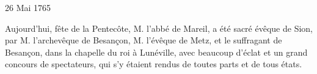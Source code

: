                      \begin{diary}{26 Mai 1765}{}
                        
                         Aujourd'hui, fête de la Pentecôte,
                              M. l'abbé
                              de Mareil, a été sacré évêque de Sion,
                           par M. l'archevêque de
                              Besançon, M. l'évêque
                              de Metz, et le
                              suffragant de Besançon,
                           dans
                           la chapelle du roi à Lunéville, avec
                           beaucoup d'éclat et un grand concours
                           de spectateurs, qui s'y étaient rendus de
                           toutes parts et de tous états. \bigskip
        
        
                     \end{diary}
                     
